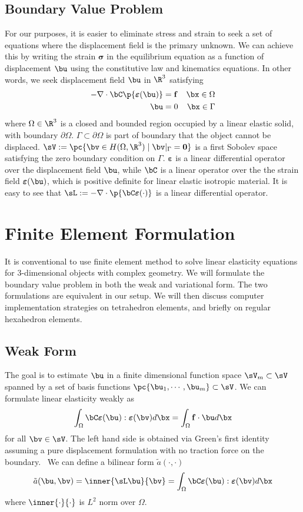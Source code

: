 \documentclass[11pt,titlepage]{article}
\newcommand{\bsigma}{\boldsymbol{\sigma}}
\newcommand{\bepsilon}{\boldsymbol{\varepsilon}}
\renewcommand{\bf}{\mathbf{f}}
\newcommand{\ta}{\tilde{a}}
\begin{document}
\subsection{Boundary Value Problem}
For our purposes, it is easier to eliminate stress and strain to seek a set of equations where the displacement field is the primary unknown. We can achieve this by writing the strain $\bsigma$ in the equilibrium equation as a function of displacement $\bu$ using the constitutive law and kinematics equations. In other words, we seek displacement field $\bu$ in $\R^3$ satisfying
\begin{align*}
    -\nabla \cdot \bC \p{\bepsilon(\bu)}
        &= \bf & \bx\in\Omega \\
    \bu &= 0   &\bx\in\Gamma
\end{align*}
where $\Omega\in\R^3$ is a closed and bounded region occupied by a linear elastic solid, with boundary $\partial\Omega$. $\Gamma \subset \partial\Omega$ is part of boundary that the object cannot be displaced. $\sV := \pc{\bv\in H(\Omega,\R^3) \mid \bv|_{\Gamma} = \mathbf{0}}$ is a first Sobolev space satisfying the zero boundary condition on $\Gamma$. $\bepsilon$ is a linear differential operator over the displacement field $\bu$, while $\bC$ is a linear operator over the the strain field $\bepsilon(\bu)$, which is positive definite for linear elastic isotropic material. It is easy to see that $\sL := -\nabla \cdot \p{\bC \bepsilon(\cdot)}$ is a linear differential operator.

\section{Finite Element Formulation}
It is conventional to use finite element method to solve linear elasticity equations for 3-dimensional objects with complex geometry. We will formulate the boundary value problem in both the weak and variational form. The two formulations are equivalent in our setup. We will then discuss computer implementation strategies on tetrahedron elements, and briefly on regular hexahedron elements.

\subsection{Weak Form}
The goal is to estimate $\bu$ in a finite dimensional function space $\sV_m\subset\sV$ spanned by a set of basis functions $\pc{\bu_1, \cdots, \bu_m} \subset \sV$. We can formulate linear elasticity weakly as
\[
    \int_{\Omega} \bC\bepsilon(\bu) : \bepsilon(\bv) d\bx
    = 
    \int_{\Omega} \bf \cdot \bu d\bx
\]
for all $\bv \in\sV$. The left hand side is obtained via Green's first identity assuming a pure displacement formulation with no traction force on the boundary.~\cite{multigrid_preconditioning_thesis_2016} We can define a bilinear form $\ta(\cdot,\cdot)$
\[
    \ta(\bu,\bv) = \inner{\sL \bu}{\bv}
        = \int_{\Omega} \bC \bepsilon(\bu) : \bepsilon(\bv) d\bx    
\]
where $\inner{\cdot}{\cdot}$ is $L^2$ norm over $\Omega$. 
\end{document}
